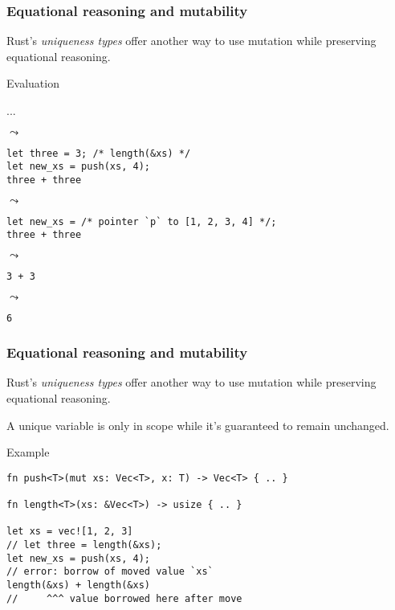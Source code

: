 \documentclass[t]{beamer}
\begin{document}
\begin{frame}[fragile]
\frametitle{Equational reasoning and mutability}
Rust's \emph{uniqueness types} offer another way to use mutation while
preserving equational reasoning.

\begin{block}{Evaluation}

...

\(\leadsto\)

\begin{verbatim}
let three = 3; /* length(&xs) */
let new_xs = push(xs, 4);
three + three
\end{verbatim}

\(\leadsto\)

\begin{verbatim}
let new_xs = /* pointer `p` to [1, 2, 3, 4] */;
three + three
\end{verbatim}

\(\leadsto\)

\begin{verbatim}
3 + 3
\end{verbatim}

\(\leadsto\)

\begin{verbatim}
6
\end{verbatim}

\end{block}

\end{frame}


\begin{frame}[fragile]
\frametitle{Equational reasoning and mutability}
Rust's \emph{uniqueness types} offer another way to use mutation while
preserving equational reasoning.

\medskip

A unique variable is only in scope while it's guaranteed to remain unchanged.

\begin{block}{Example}
\begin{verbatim}
fn push<T>(mut xs: Vec<T>, x: T) -> Vec<T> { .. }

fn length<T>(xs: &Vec<T>) -> usize { .. }

let xs = vec![1, 2, 3]
// let three = length(&xs);
let new_xs = push(xs, 4);
// error: borrow of moved value `xs`
length(&xs) + length(&xs)
//     ^^^ value borrowed here after move
\end{verbatim}
\end{block}

\end{frame}
\end{document}
